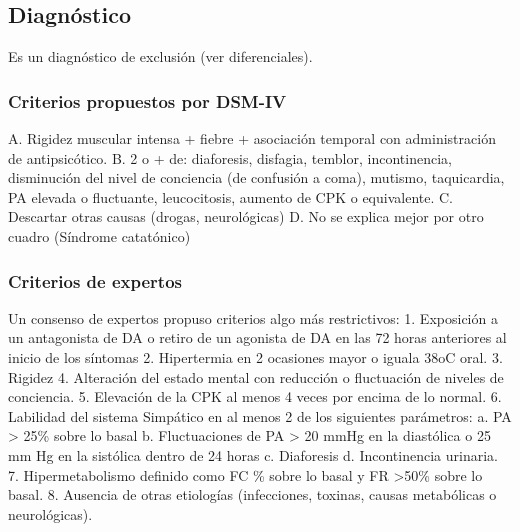 \documentclass{scrbook}
\begin{document}
\subsection*{Diagnóstico}
Es un diagnóstico de exclusión (ver diferenciales).
\subsubsection*{Criterios propuestos por DSM-IV}
A. Rigidez muscular intensa + fiebre + asociación temporal con administración de antipsicótico.
B. 2 o + de: diaforesis, disfagia, temblor, incontinencia, disminución del nivel de conciencia (de confusión a coma), mutismo, taquicardia, PA elevada o fluctuante, leucocitosis, aumento de CPK o equivalente.
C. Descartar otras causas (drogas, neurológicas)
D. No se explica mejor por otro cuadro (Síndrome catatónico)
\subsubsection*{Criterios de expertos}
Un consenso de expertos propuso criterios algo más restrictivos\cite{ware2018neuroleptic}:
1. Exposición a un antagonista de DA o retiro de un agonista de DA en las 72 horas anteriores al inicio de los síntomas
2. Hipertermia en 2 ocasiones mayor o iguala 38oC oral.
3. Rigidez
4. Alteración del estado mental con reducción o fluctuación de niveles de conciencia.
5. Elevación de la CPK al menos 4 veces por encima de lo normal.
6. Labilidad del sistema Simpático en al menos 2 de los siguientes parámetros:
a. PA > 25\% sobre lo basal
b. Fluctuaciones de PA > 20 mmHg en la diastólica o 25 mm Hg en la sistólica dentro de 24 horas
c. Diaforesis
d. Incontinencia urinaria.
7. Hipermetabolismo definido como FC \% sobre lo basal y FR \faArrowUp >50\% sobre lo basal.
8. Ausencia de otras etiologías (infecciones, toxinas, causas metabólicas o neurológicas).
\end{document}
